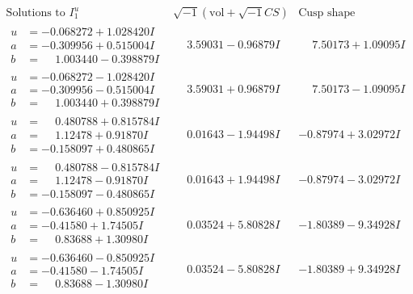 \documentclass[1p]{elsarticle_modified}
\theoremstyle{definition}
\newcommand{\I}{\sqrt{-1}}
\begin{document}
$$\begin{array}{c|c|c}  
\text{Solutions to }I^u_{1}& \I (\text{vol} + \sqrt{-1}CS) & \text{Cusp shape}\\
 \hline 
\begin{aligned}
u &= -0.068272 + 1.028420 I \\
a &= -0.309956 + 0.515004 I \\
b &= \phantom{-}1.003440 - 0.398879 I\end{aligned}
 & \phantom{-}3.59031 - 0.96879 I & \phantom{-}7.50173 + 1.09095 I \\ \hline\begin{aligned}
u &= -0.068272 - 1.028420 I \\
a &= -0.309956 - 0.515004 I \\
b &= \phantom{-}1.003440 + 0.398879 I\end{aligned}
 & \phantom{-}3.59031 + 0.96879 I & \phantom{-}7.50173 - 1.09095 I \\ \hline\begin{aligned}
u &= \phantom{-}0.480788 + 0.815784 I \\
a &= \phantom{-}1.12478 + 0.91870 I \\
b &= -0.158097 + 0.480865 I\end{aligned}
 & \phantom{-}0.01643 - 1.94498 I & -0.87974 + 3.02972 I \\ \hline\begin{aligned}
u &= \phantom{-}0.480788 - 0.815784 I \\
a &= \phantom{-}1.12478 - 0.91870 I \\
b &= -0.158097 - 0.480865 I\end{aligned}
 & \phantom{-}0.01643 + 1.94498 I & -0.87974 - 3.02972 I \\ \hline\begin{aligned}
u &= -0.636460 + 0.850925 I \\
a &= -0.41580 + 1.74505 I \\
b &= \phantom{-}0.83688 + 1.30980 I\end{aligned}
 & \phantom{-}0.03524 + 5.80828 I & -1.80389 - 9.34928 I \\ \hline\begin{aligned}
u &= -0.636460 - 0.850925 I \\
a &= -0.41580 - 1.74505 I \\
b &= \phantom{-}0.83688 - 1.30980 I\end{aligned}
 & \phantom{-}0.03524 - 5.80828 I & -1.80389 + 9.34928 I \\ \hline\begin{aligned}

\end{aligned}
\end{array}$$
\end{document}
